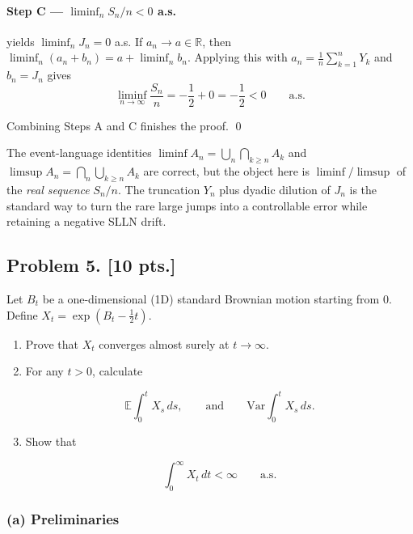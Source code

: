 \documentclass[11pt,a4paper]{article}
\begin{document}
\paragraph{Step C --- \(\liminf_n S_n/n<0\) a.s.}
 yields \(\liminf_n J_n=0\) a.s. If \(a_n\to a\in\mathbb{R}\), then \(\liminf_n(a_n+b_n)=a+\liminf_n b_n\). Applying this with \(a_n=\frac1n\sum_{k=1}^n Y_k\) and \(b_n=J_n\) gives
\[
\liminf_{n\to\infty}\frac{S_n}{n}
=
-\frac12
+
0
=
-\frac12
<
0
\qquad\text{a.s.}
\]

Combining Steps A and C finishes the proof.
\qed

\begin{remark*}
The event-language identities \(\liminf A_n=\bigcup_n\bigcap_{k\ge n}A_k\) and \(\limsup A_n=\bigcap_n\bigcup_{k\ge n}A_k\) are correct, but the object here is \(\liminf/\limsup\) of the \emph{real sequence} \(S_n/n\). The truncation \(Y_n\) plus dyadic dilution of \(J_n\) is the standard way to turn the rare large jumps into a controllable error while retaining a negative SLLN drift.
\end{remark*}

\subsection{Problem 5. [10 pts.]}
Let \( B_t \) be a one-dimensional (1D) standard Brownian motion starting from 0. Define \( X_t = \exp(B_t - \tfrac{1}{2} t) \).
\begin{enumerate}[label=(\alph*)]
    \item Prove that \( X_t \) converges almost surely at \( t \to \infty \).
    \item For any \( t > 0 \), calculate

    \[
    \mathbb{E} \int_0^t X_s\, ds, \qquad \text{and} \qquad \mathrm{Var} \int_0^t X_s\, ds.
    \]
    \item Show that

    \[
    \int_0^\infty X_t\, dt < \infty \qquad \text{a.s.}
    \]
\end{enumerate}

\setcounter{section}{5}
\setcounter{theorem}{0}
\setcounter{definition}{0}
\setcounter{remark}{0}
\setcounter{note}{0}

\subsubsection{(a) Preliminaries}
\end{document}
